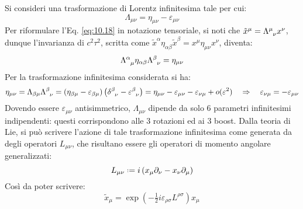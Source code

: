 Si consideri una trasformazione di Lorentz infinitesima tale per cui:
\begin{equation*}
	\Lambda_{\mu \nu} = \eta_{\mu \nu} - \varepsilon_{\mu \nu}
\end{equation*}
Per riformulare l'Eq. \ref{eq:10.18} in notazione tensoriale, si noti che $ \tilde{x}^{\mu} = \tensor{\Lambda}{^\mu_\nu} x^{\nu} $, dunque l'invarianza di $ c^2 \tau^2 $, scritta come $ \tilde{x}^{\alpha} \eta_{\alpha \beta} \tilde{x}^{\beta} = x^{\mu} \eta_{\mu \nu} x^{\nu} $, diventa:
\begin{equation}
	\tensor{\Lambda}{^\alpha_\mu} \eta_{\alpha \beta} \tensor{\Lambda}{^\beta_\nu} = \eta_{\mu \nu}
	\label{eq:10.32}
\end{equation}
Per la trasformazione infinitesima considerata si ha:
\begin{equation*}
	\eta_{\mu \nu} = \Lambda_{\beta \mu} \tensor{\Lambda}{^\beta_\nu} = \left( \eta_{\beta \mu} - \varepsilon_{\beta \mu} \right) \left( \tensor{\delta}{^\beta_\nu} - \tensor{\varepsilon}{^\beta_\nu} \right) = \eta_{\mu \nu} - \varepsilon_{\mu \nu} - \varepsilon_{\nu \mu} + o(\varepsilon^2)
	\quad \Rightarrow \quad
	\varepsilon_{\nu \mu} = - \varepsilon_{\mu \nu}
\end{equation*}
Dovendo essere $ \varepsilon_{\mu \nu} $ antisimmetrico, $ \Lambda_{\mu \nu} $ dipende da solo 6 parametri infinitesimi indipendenti: questi corrispondono alle 3 rotazioni ed ai 3 boost. Dalla teoria di Lie, si può scrivere l'azione di tale trasformazione infinitesima come generata da degli operatori $ L_{\mu \nu} $, che risultano essere gli operatori di momento angolare generalizzati:
\begin{equation}
	L_{\mu \nu} \defeq i \left( x_{\mu} \pa_{\nu} - x_{\nu} \pa_{\mu} \right)
	\label{eq:10.33}
\end{equation}
Così da poter scrivere:
\begin{equation}
	\tilde{x}_{\mu} = \exp \left( -\tfrac{1}{2} i \varepsilon_{\rho \sigma} L^{\rho \sigma} \right) x_{\mu}
	\label{eq:10.34}
\end{equation}

